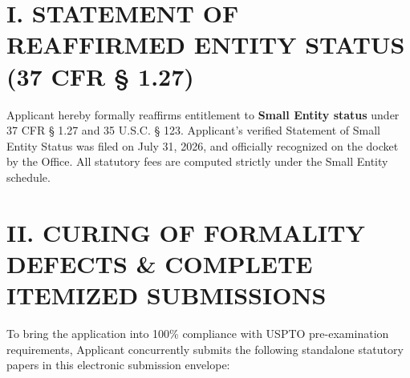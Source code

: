 \documentclass[11pt,letterpaper]{article}
\begin{document}
\section*{I. STATEMENT OF REAFFIRMED ENTITY STATUS (37 CFR \S{} 1.27)}

Applicant hereby formally reaffirms entitlement to \textbf{Small Entity status} under 37 CFR \S{} 1.27 and 35 U.S.C. \S{} 123. Applicant's verified Statement of Small Entity Status was filed on July 31, 2026, and officially recognized on the docket by the Office. All statutory fees are computed strictly under the Small Entity schedule.

\section*{II. CURING OF FORMALITY DEFECTS \& COMPLETE ITEMIZED SUBMISSIONS}

To bring the application into 100\% compliance with USPTO pre-examination requirements, Applicant concurrently submits the following standalone statutory papers in this electronic submission envelope:
\end{document}
